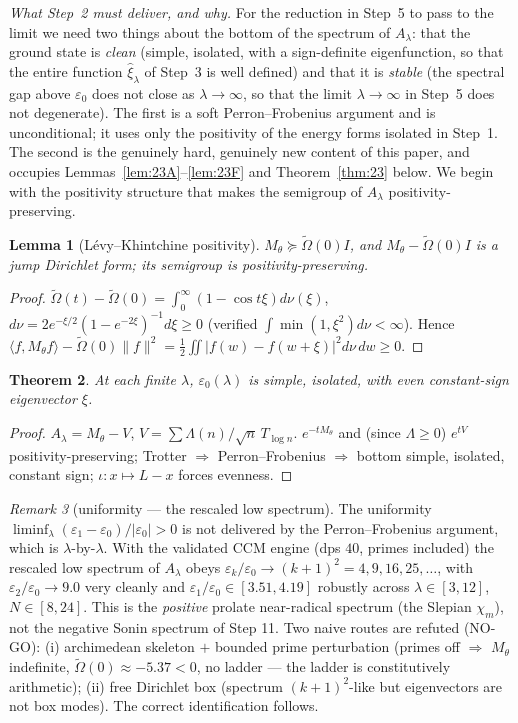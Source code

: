 \documentclass[11pt]{amsart}
\newtheorem{theorem}{Theorem}[section]
\newtheorem{lemma}[theorem]{Lemma}
\theoremstyle{definition}
\theoremstyle{remark}
\newtheorem{remark}[theorem]{Remark}
\newcommand{\Om}{\widetilde{\Omega}}
\newcommand{\ve}{\varepsilon}
\begin{document}
\emph{What Step~2 must deliver, and why.} For the reduction in Step~5 to pass to the limit we
need two things about the bottom of the spectrum of $A_\lambda$: that the ground state is
\emph{clean} (simple, isolated, with a sign-definite eigenfunction, so that the entire function
$\hat\xi_\lambda$ of Step~3 is well defined) and that it is \emph{stable} (the spectral gap above
$\ve_0$ does not close as $\lambda\to\infty$, so that the limit $\lambda\to\infty$ in Step~5 does
not degenerate). The first is a soft Perron--Frobenius argument and is unconditional; it uses
only the positivity of the energy forms isolated in Step~1. The second is the genuinely hard,
genuinely new content of this paper, and occupies Lemmas~\ref{lem:23A}--\ref{lem:23F} and
Theorem~\ref{thm:23} below. We begin with the positivity structure that makes the semigroup of
$A_\lambda$ positivity-preserving.

\begin{lemma}[L\'evy--Khintchine positivity]
$M_\theta\succeq\Om(0)I$, and $M_\theta-\Om(0)I$ is a jump Dirichlet form; its semigroup is
positivity-preserving.
\end{lemma}
\begin{proof}
$\Om(t)-\Om(0)=\int_0^\infty(1-\cos t\xi)d\nu(\xi)$, $d\nu=2e^{-\xi/2}(1-e^{-2\xi})^{-1}d\xi\ge0$
(verified $\int\min(1,\xi^2)d\nu<\infty$). Hence
$\langle f,M_\theta f\rangle-\Om(0)\|f\|^2=\tfrac12\iint|f(w)-f(w+\xi)|^2d\nu\,dw\ge0$.
\end{proof}
\begin{theorem}\label{thm:22}
At each finite $\lambda$, $\ve_0(\lambda)$ is simple, isolated, with even constant-sign
eigenvector $\xi$.
\end{theorem}
\begin{proof}
$A_\lambda=M_\theta-V$, $V=\sum\Lambda(n)/\sqrt n\,T_{\log n}$. $e^{-tM_\theta}$ and (since
$\Lambda\ge0$) $e^{tV}$ positivity-preserving; Trotter $\Rightarrow$ Perron--Frobenius
$\Rightarrow$ bottom simple, isolated, constant sign; $\iota:x\mapsto L-x$ forces evenness.
\end{proof}
\begin{remark}[uniformity --- the rescaled low spectrum]
The uniformity $\liminf_\lambda(\ve_1-\ve_0)/|\ve_0|>0$ is not delivered by the
Perron--Frobenius argument, which is $\lambda$-by-$\lambda$. With the validated CCM engine
(dps $40$, primes included) the rescaled low spectrum of $A_\lambda$ obeys
$\ve_k/\ve_0\to(k+1)^2=4,9,16,25,\dots$, with $\ve_2/\ve_0\to9.0$ very cleanly and
$\ve_1/\ve_0\in[3.51,4.19]$ robustly across $\lambda\in[3,12]$, $N\in[8,24]$. This is the
\emph{positive} prolate near-radical spectrum (the Slepian $\chi_m$), not the negative
Sonin spectrum of Step 11. Two naive routes are refuted (NO-GO): (i) archimedean skeleton
$+$ bounded prime perturbation (primes off $\Rightarrow$ $M_\theta$ indefinite,
$\widetilde\Omega(0)\approx-5.37<0$, no ladder --- the ladder is constitutively
arithmetic); (ii) free Dirichlet box (spectrum $(k+1)^2$-like but eigenvectors are not box
modes). The correct identification follows.
\end{remark}
\end{document}
